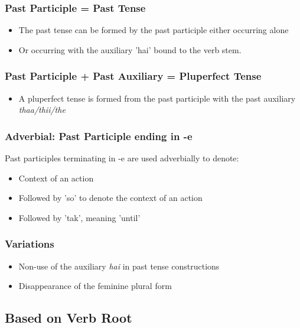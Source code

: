 \documentclass[a4paper]{article}
\begin{document}
\subsubsection{Past Participle = Past Tense}

\begin{itemize}
\item
The past tense can be formed by the past participle either occurring alone
\item
Or occurring with the auxiliary 'hai' bound to the verb stem.
\end{itemize}

\subsubsection{Past Participle + Past Auxiliary = Pluperfect Tense}

\begin{itemize}
\item
A pluperfect tense is formed from the past participle with the past auxiliary \emph{thaa/thii/the}
\end{itemize}

\subsubsection{Adverbial: Past Participle ending in -e}

Past participles terminating in -e are used adverbially to denote:

\begin{itemize}
\item
Context of an action
\item
Followed by 'so' to denote the context of an action
\item
Followed by 'tak', meaning 'until'
\end{itemize}

\subsubsection{Variations}

\begin{itemize}
\item
Non-use of the auxiliary \textit{hai} in past tense constructions
\item
Disappearance of the feminine plural form
\end{itemize}

\subsection{Based on Verb Root}
\end{document}
